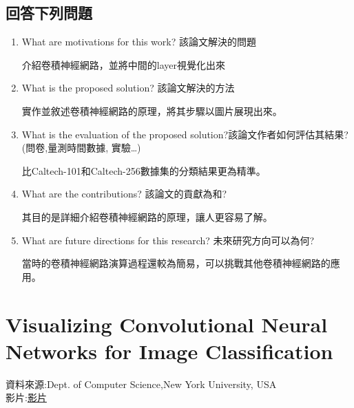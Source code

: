 \subsection{回答下列問題}

\begin{enumerate}
\item  What are motivations for this work? 該論文解決的問題  

介紹卷積神經網路，並將中間的layer視覺化出來

\item  What is the proposed solution? 該論文解決的方法

實作並敘述卷積神經網路的原理，將其步驟以圖片展現出來。

\item  What is the evaluation of the proposed solution?該論文作者如何評估其結果? (問卷,量測時間數據, 實驗…)

比Caltech-101和Caltech-256數據集的分類結果更為精準。

\item  What are the contributions? 該論文的貢獻為和?

其目的是詳細介紹卷積神經網路的原理，讓人更容易了解。

\item  What are future directions for this research? 未來研究方向可以為何?

當時的卷積神經網路演算過程還較為簡易，可以挑戰其他卷積神經網路的應用。

\end{enumerate}


\section{Visualizing Convolutional Neural Networks for Image Classification}
資料來源:{Dept. of Computer Science,New York University, USA\cite{DBLP:journals/corr/abs-1804-11191}}
\\
影片:\href{1331_VI.mp4}{影片}
      
